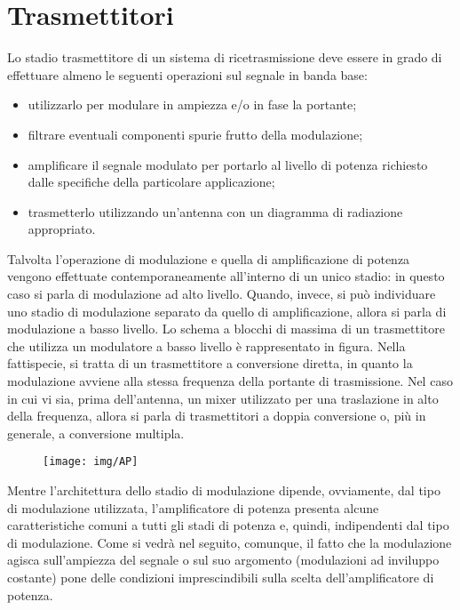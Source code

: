 \chapter{Trasmettitori}
\label{ch:trasmettitori}
Lo stadio trasmettitore di un sistema di ricetrasmissione deve essere in grado di effettuare almeno le seguenti operazioni sul segnale in banda base:
\begin{itemize}
	\item utilizzarlo per modulare in ampiezza e/o in fase la portante;
	\item filtrare eventuali componenti spurie frutto della modulazione;
	\item amplificare il segnale modulato per portarlo al livello di potenza richiesto dalle specifiche della particolare applicazione;
	\item trasmetterlo utilizzando un'antenna con un diagramma di radiazione appropriato.
\end{itemize}
Talvolta l'operazione di modulazione e quella di amplificazione di potenza vengono effettuate contemporaneamente all'interno di un unico stadio: in questo caso si parla di modulazione ad alto livello. Quando, invece, si può individuare uno stadio di modulazione separato da quello di amplificazione, allora si parla di modulazione a basso livello. Lo schema a blocchi di massima di un trasmettitore che utilizza un modulatore a basso livello è rappresentato in figura. Nella fattispecie, si tratta di un trasmettitore a conversione diretta, in quanto la modulazione avviene alla stessa frequenza della portante di trasmissione. Nel caso in cui vi sia, prima dell'antenna, un mixer utilizzato per una traslazione in alto della frequenza, allora si parla di trasmettitori a doppia conversione o, più in generale, a conversione multipla.

\begin{figure}[hbt]
	\centering
	\texttt{[image: img/AP]}
	\caption{}
	\label{fig:aprf}
\end{figure}

Mentre l'architettura dello stadio di modulazione dipende, ovviamente, dal tipo di modulazione	utilizzata, l'amplificatore di potenza presenta alcune caratteristiche comuni a tutti gli stadi di	potenza e, quindi, indipendenti dal tipo di modulazione. Come si vedrà nel seguito, comunque, il	fatto che la modulazione agisca sull'ampiezza del segnale o sul suo argomento (modulazioni ad	inviluppo costante) pone delle condizioni imprescindibili sulla scelta dell'amplificatore di potenza.

